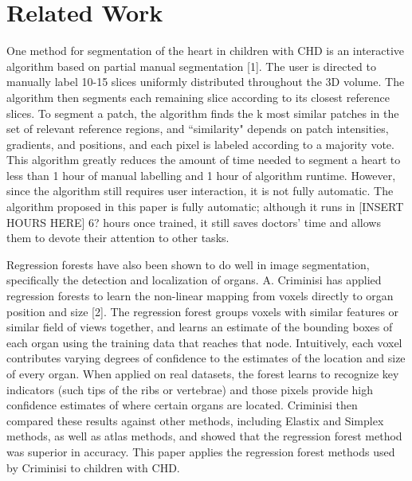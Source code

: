 \section{Related Work}
One method for segmentation of the heart in children with CHD is an interactive algorithm based on partial manual segmentation [1]. The user is directed to manually label 10-15 slices uniformly distributed throughout the 3D volume. The algorithm then segments each remaining slice according to its closest reference slices. To segment a patch, the algorithm finds the k most similar patches in the set of relevant reference regions, and ``similarity" depends on patch intensities, gradients, and positions, and each pixel is labeled according to a majority vote. This algorithm greatly reduces the amount of time needed to segment a heart to less than 1 hour of manual labelling and 1 hour of algorithm runtime. However, since the algorithm still requires user interaction, it is not fully automatic. The algorithm proposed in this paper is fully automatic; although it runs in [INSERT HOURS HERE]	6? hours once trained, it still saves doctors' time and allows them to devote their attention to other tasks.

Regression forests have also been shown to do well in image segmentation, specifically the detection and localization of organs. A. Criminisi has applied regression forests to learn the non-linear mapping from voxels directly to organ position and size [2]. The regression forest groups voxels with similar features or similar field of views together, and learns an estimate of the bounding boxes of each organ using the training data that reaches that node. Intuitively, each voxel contributes varying degrees of confidence to the estimates of the location and size of every organ. When applied on real datasets, the forest learns to recognize key indicators (such tips of the ribs or vertebrae) and those pixels provide high confidence estimates of where certain organs are located. Criminisi then compared these results against other methods, including Elastix and Simplex methods, as well as atlas methods, and showed that the regression forest method was superior in accuracy. This paper applies the regression forest methods used by Criminisi to children with CHD.

